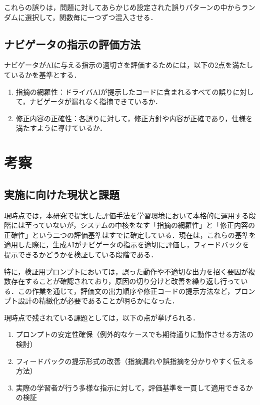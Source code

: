 \documentclass[twoside,twocolumn,10pt]{jsarticle}
\begin{document}
これらの誤りは，問題に対してあらかじめ設定された誤りパターンの中からランダムに選択して，関数毎に一つずつ混入させる．

\subsection{ナビゲータの指示の評価方法}
ナビゲータがAIに与える指示の適切さを評価するためには，以下の2点を満たしているかを基準とする．
\begin{enumerate}
    \item 指摘の網羅性：ドライバAIが提示したコードに含まれるすべての誤りに対して，ナビゲータが漏れなく指摘できているか．
    \item 修正内容の正確性：各誤りに対して，修正方針や内容が正確であり，仕様を満たすように導けているか．
\end{enumerate}

\section{考察}\label{考察}

\subsection{実施に向けた現状と課題}
現時点では，本研究で提案した評価手法を学習環境において本格的に運用する段階には至っていないが，システムの中核をなす「指摘の網羅性」と「修正内容の正確性」という二つの評価基準はすでに確定している．現在は，これらの基準を適用した際に，生成AIがナビゲータの指示を適切に評価し，フィードバックを提示できるかどうかを検証している段階である．

特に，検証用プロンプトにおいては，誤った動作や不適切な出力を招く要因が複数存在することが確認されており，原因の切り分けと改善を繰り返し行っている．この作業を通じて，評価文の出力順序や修正コードの提示方法など，プロンプト設計の精緻化が必要であることが明らかになった．

現時点で残されている課題としては，以下の点が挙げられる．

\begin{enumerate}
    \item プロンプトの安定性確保（例外的なケースでも期待通りに動作させる方法の検討）
    \item フィードバックの提示形式の改善（指摘漏れや誤指摘を分かりやすく伝える方法）
    \item 実際の学習者が行う多様な指示に対して，評価基準を一貫して適用できるかの検証
\end{enumerate}
\end{document}
